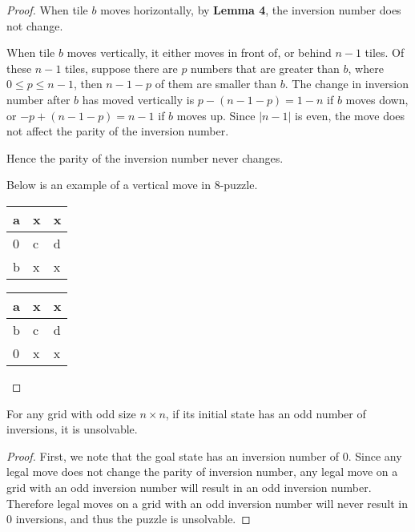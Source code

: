 \documentclass{llncs}
\begin{document}
\begin{proof}
When tile $b$ moves horizontally, by \textbf{Lemma 4}, the inversion number does not change.

When tile $b$ moves vertically, it either moves in front of, or behind $n - 1$ tiles. Of these $n - 1$ tiles, suppose there are $p$ numbers that are greater than $b$, where $0 \leq p \leq n - 1$, then $n - 1 - p$ of them are smaller than $b$. The change in inversion number after $b$ has moved vertically is $p-(n-1-p) = 1-n$ if $b$ moves down, or $-p + (n-1-p) = n-1$ if $b$ moves up. Since $|n-1|$ is even, the move does not affect the parity of the inversion number.

Hence the parity of the inversion number never changes.

Below is an example of a vertical move in $8$-puzzle.
\begin{table}
	\centering
	\label{tab3}
	\begin{tabular}{|p{2mm}|p{2mm}|p{2mm}|} \hline
	a & x & x\\ \hline
	0 & c & d\\ \hline
	b & x & x\\ \hline
	\end{tabular}
\end{table}
\begin{table}
	\centering
	\label{tab4}
	\begin{tabular}{|p{2mm}|p{2mm}|p{2mm}|} \hline
	a & x & x\\ \hline
	b & c & d\\ \hline
	0 & x & x\\ \hline
\end{tabular}
\end{table}
\end{proof}

\begin{lemma}
For any grid with odd size $n \times n$, if its initial state has an odd number of inversions, it is unsolvable.
\end{lemma}

\begin{proof}
First, we note that the goal state has an inversion number of $0$. Since any legal move does not change the parity of inversion number, any legal move on a grid with an odd inversion number will result in an odd inversion number. Therefore legal moves on a grid with an odd inversion number will never result in $0$ inversions, and thus the puzzle is unsolvable.
\end{proof}
\end{document}
